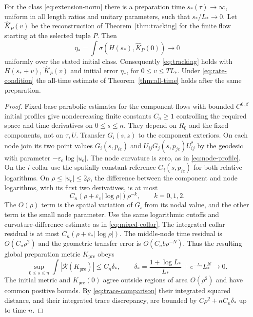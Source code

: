 \begin{theorem}\label{thm:entry}
For the class \eqref{eq:extension-norm} there
is a preparation time $s_*(\tau)\to\infty$,
uniform in all length ratios and unitary
parameters, such that $s_*/L_*\to0$.
Let $\widehat K_P(v)$ be the reconstruction
of Theorem~\ref{thm:tracking} for the finite
flow starting at the selected tuple $P$.
Then
\[
 \eta_*=\int\sigma(H(s_*),\widehat K_P(0))\to0
\]
uniformly over the stated initial class.
Consequently \eqref{eq:tracking} holds with
$H(s_*+v)$, $\widehat K_P(v)$ and initial
error $\eta_*$, for $0\le v\le TL_*$.
Under \eqref{eq:rate-condition} the all-time
estimate of Theorem~\ref{thm:all-time} holds
after the same preparation.
\end{theorem}
\begin{proof}
Fixed-base parabolic estimates for the component
flows with bounded $C^{6,\beta}$ initial profiles
give nondecreasing finite constants $C_n\ge1$
controlling the required space and time derivatives
on $0\le s\le n$. They depend on $R_0$ and the
fixed components, not on $\tau,U$.
Transfer $G_i(s,z)$ to the component exteriors.
On each node join its two point values
$G_i(s,p_{ie})$ and $U_{ij}G_j(s,p_{je})U_{ij}^*$
by the geodesic with parameter
$-\varepsilon_e\log|u_e|$. The node curvature
is zero, as in \eqref{eq:node-profile}.
On the $i$ collar use the spatially constant
reference $G_i(s,p_{ie})$ for both relative
logarithms. On $\rho\le|u_e|\le2\rho$, the difference
between the component and node logarithms, with
its first two derivatives, is at most
\[
 C_n(\rho+\varepsilon_e|\log\rho|)\rho^{-k},
 \qquad k=0,1,2 .
\]
The $O(\rho)$ term is the spatial variation
of $G_i$ from its nodal value, and the
other term is the small node parameter.
Use the same logarithmic cutoffs and
curvature-difference estimate as in
\eqref{eq:mixed-collar}. The integrated
collar residual is at most
$C_n(\rho+\varepsilon_*|\log\rho|)$.
The middle-node time residual is
$O(C_n\rho^2)$ and the geometric transfer
error is $O(C_nb\rho^{-N})$.
Thus the resulting global preparation
metric $K_{\mathrm{pre}}$ obeys
\[
 \sup_{0\le s\le n}\int|\mathcal R(K_{\mathrm{pre}})|
 \le C_n\delta_*,
 \qquad
 \delta_*=\frac{1+\log L_*}{L_*}+e^{-L_*}L_*^N\to0 .
\]
The initial metric and $K_{\mathrm{pre}}(0)$
agree outside regions of area $O(\rho^2)$
and have common positive bounds. By
\eqref{eq:trace-comparison} their integrated squared
distance, and their integrated trace
discrepancy, are bounded by
$C\rho^2+nC_n\delta_*$ up to time $n$.


\end{proof}
